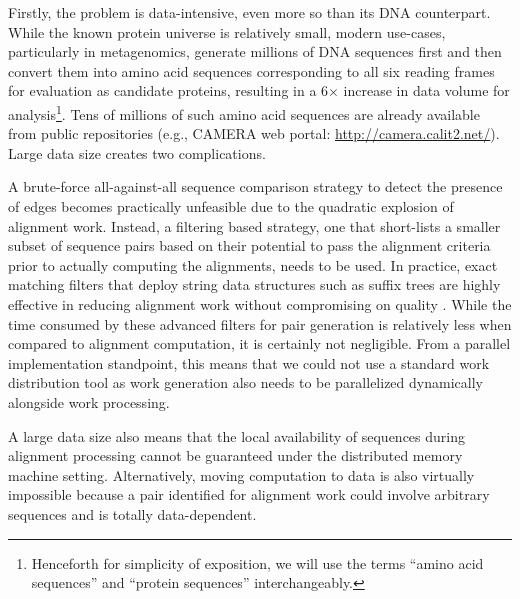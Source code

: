 \documentclass[10pt,journal,letterpaper,compsoc]{IEEEtran}
\begin{document}
Firstly, the problem is data-intensive, even more so than its DNA counterpart. While the known protein universe is relatively small, modern use-cases, particularly in metagenomics, generate millions of DNA sequences first and then convert them into amino acid sequences corresponding to all six reading frames for evaluation as candidate proteins, resulting in a 6$\times$ increase in data volume for analysis\footnote{Henceforth for simplicity of exposition, we will use the terms ``amino acid sequences'' and ``protein sequences'' interchangeably.}. Tens of millions of such amino acid sequences are already available from public repositories (e.g., CAMERA web portal: \url{http://camera.calit2.net/}). Large data size creates two complications.  
\begin{compactenum}[i)]
\item
 A brute-force all-against-all sequence comparison strategy to detect the presence of edges becomes practically unfeasible due to the quadratic explosion of alignment work. Instead, a filtering based strategy, one that short-lists a smaller subset of sequence pairs based on their potential to pass the alignment criteria prior to actually computing the alignments, needs to be used. In practice, exact matching filters that deploy string data structures such as suffix trees \cite{Weiner73} are highly effective in reducing alignment work without compromising on quality \cite{KalyanaramanJPDC07,KalyanaramanNAR03}. While the time consumed by these advanced filters for pair generation is relatively less when compared to alignment computation, it is certainly not negligible. From a parallel implementation standpoint, this means that we could not use a standard work distribution tool as work generation also needs to be parallelized dynamically alongside work processing. 
\item
A large data size also means that the local availability of sequences during alignment processing cannot be guaranteed under the distributed memory machine setting. Alternatively, moving computation to data is also virtually impossible because a pair identified for alignment work could involve arbitrary sequences and is totally data-dependent. 
\end{compactenum}
\end{document}
